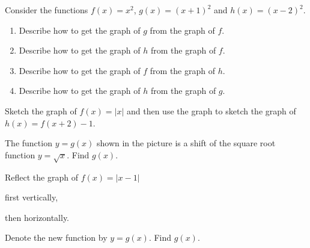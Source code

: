 \begin{example}
  Consider the functions $f(x)=x^2$, $g(x)=(x+1)^2$ and $h(x)=(x-2)^2$.
  \begin{enumerate}
    \item Describe how to get the graph of $g$ from the graph of $f$.
    \vspace*{3\baselineskip}
    \item Describe how to get the graph of $h$ from the graph of $f$.
    \vspace*{3\baselineskip}
    \item Describe how to get the graph of $f$ from the graph of $h$.
    \vspace*{3\baselineskip}
    \item Describe how to get the graph of $h$ from the graph of $g$.
    \vspace*{3\baselineskip}
  \end{enumerate}
\end{example}

\newpage

\begin{example}
  Sketch the graph of \(f(x)=|x|\) and then use the graph to sketch the graph of \(h(x)=f(x+2)-1\). 
\end{example}

\begin{example}
  The function $y=g(x)$ shown in the picture is a shift of the square root function $y=\sqrt{x}$. Find $g(x)$.\\

\end{example}
\vspace*{-0.4\textheight}

\newpage

\begin{example}
  Reflect the graph of \(f(x)=|x-1|\)\\
  \begin{enumerate*}
    \item first vertically,
    \item then horizontally.\hfill\mbox{}
  \end{enumerate*}

Denote the new function by $y=g(x)$. Find $g(x)$.
\end{example}

